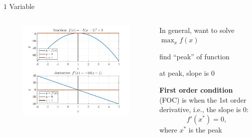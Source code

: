 \documentclass[11pt,aspectratio=169,usenames,dvipsnames]{beamer}
\let\tempone\itemize
\let\temptwo\enditemize
\renewenvironment{itemize}{\tempone\addtolength{\itemsep}{\fill}}{\temptwo}
\begin{document}
\begin{frame}{$1$ Variable}
\label{slide:_1__Variable}
    \begin{columns}
        \begin{column}{0.6\textwidth}
            \begin{figure}
                \includegraphics[width=\textwidth]{./figures/1Var.png}
            \end{figure}
        \end{column}
        \begin{column}{0.4\textwidth}
            In general, want to solve $\max_{x} f( x )$
            \begin{itemize}
                \item find ``peak'' of function
                \item at peak, slope is $ 0 $
                \item \textbf{First order condition} (FOC) is when the 1st order derivative, i.e., the slope is $ 0 $:
                \begin{equation*}
                   f'( x^{*} ) = 0
                ,\end{equation*}
                where $ x^{*} $ is the peak
            \end{itemize}
        \end{column}
    \end{columns}
\end{frame}
\end{document}
